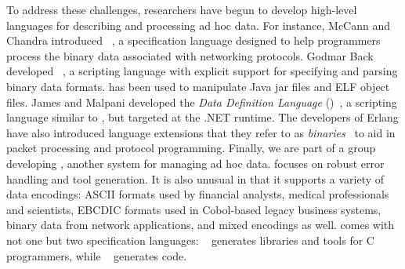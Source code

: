To address these challenges, 
researchers have begun to develop high-level languages 
for describing and processing ad hoc data.  For instance,
McCann and Chandra introduced
\packettypes{}~\cite{sigcomm00}, a specification language designed to help 
programmers process the binary data associated
with networking protocols.  Godmar Back developed
\datascript{}~\cite{gpce02}, a scripting language with explicit
support for specifying and parsing binary data formats. \datascript{}
has been used to manipulate Java jar files and ELF object files.  James and Malpani developed the \textit{Data Definition Language} (\ddl{})~\cite{james+:ddl-dot-net}, a scripting language similar to \datascript{}, but targeted at the .NET runtime. The
developers of Erlang have also introduced language extensions that
they refer to as {\em binaries}~\cite{erlang-bits,gustafsson+:binaries} 
to aid in packet
processing and protocol programming.
Finally, we are part of a group developing
\pads{}, another system for managing ad hoc data.
\pads{} focuses on robust error handling and tool generation.
It is also unusual in that it supports a variety of data encodings:
ASCII formats used by financial analysts, medical professionals and scientists,
EBCDIC formats used in Cobol-based legacy business systems,
binary data from network applications, and mixed encodings as well.
\pads{} comes with not one but two specification languages: 
\padsc{}~\cite{fisher+:pads} generates
libraries and tools for C programmers, while \padsml~\cite{mandelbaum+:padsml}
generates \ocaml{} code.



